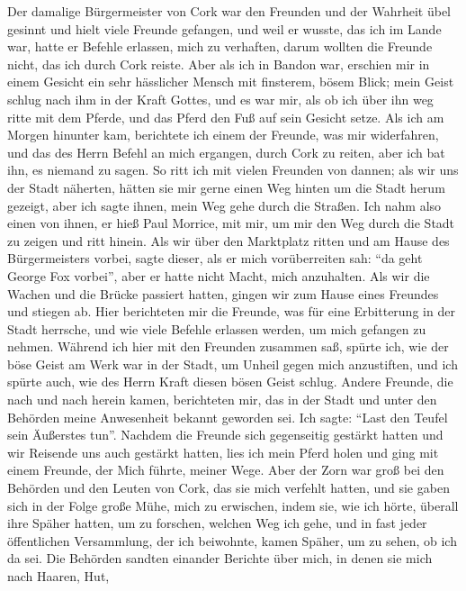 Der damalige Bürgermeister von Cork war den Freunden
und der Wahrheit übel gesinnt und hielt viele Freunde gefangen,
und weil er wusste, das ich im Lande war, hatte er Befehle
erlassen, mich zu verhaften, darum wollten die Freunde nicht,
das ich durch Cork reiste. Aber als ich in Bandon war, erschien
mir in einem Gesicht ein sehr hässlicher Mensch mit finsterem,
bösem Blick; mein Geist schlug nach ihm in der Kraft Gottes,
und es war mir, als ob ich über ihn weg ritte mit dem Pferde,
und das Pferd den Fuß auf sein Gesicht setze. Als ich am Morgen
hinunter kam, berichtete ich einem der Freunde, was mir 
widerfahren, und das des Herrn Befehl an mich ergangen, durch Cork
zu reiten, aber ich bat ihn, es niemand zu sagen. So ritt ich
mit vielen Freunden von dannen; als wir uns der Stadt näherten,
hätten sie mir gerne einen Weg hinten um die Stadt herum 
gezeigt, aber ich sagte ihnen, mein Weg gehe durch die Straßen.
Ich nahm also einen von ihnen, er hieß Paul 
Morrice, mit mir,
um mir den Weg durch die Stadt zu zeigen und ritt hinein.
Als wir über den Marktplatz ritten und am Hause des 
Bürgermeisters vorbei, sagte dieser, als er mich vorüberreiten sah: "`da
geht George Fox vorbei"', aber er hatte nicht Macht, mich 
anzuhalten. Als wir die Wachen und die Brücke passiert hatten,
gingen wir zum Hause eines Freundes und stiegen ab. Hier
berichteten mir die Freunde, was für eine Erbitterung in der
Stadt herrsche, und wie viele Befehle erlassen werden, um mich
gefangen zu nehmen. Während ich hier mit den Freunden zusammen 
saß, spürte ich, wie der böse Geist am Werk war in der
Stadt, um Unheil gegen mich anzustiften, und ich spürte auch,
wie des Herrn Kraft diesen bösen Geist schlug. Andere Freunde,
die nach und nach herein kamen, berichteten mir, das in der
Stadt und unter den Behörden meine Anwesenheit bekannt geworden 
sei. Ich sagte: "`Last den Teufel sein Äußerstes tun"'.
Nachdem die Freunde sich gegenseitig gestärkt hatten und wir
Reisende uns auch gestärkt hatten, lies ich mein Pferd holen und
ging mit einem Freunde, der Mich führte, meiner Wege. Aber
der Zorn war groß bei den Behörden und den Leuten von Cork,
das sie mich verfehlt hatten, und sie gaben sich in der Folge
große Mühe, mich zu erwischen, indem sie, wie ich hörte, überall
ihre Späher hatten, um zu forschen, welchen Weg ich gehe, und
in fast jeder öffentlichen Versammlung, der ich beiwohnte, kamen
Späher, um zu sehen, ob ich da sei. Die Behörden sandten 
einander Berichte über mich, in denen sie mich nach Haaren, Hut,
